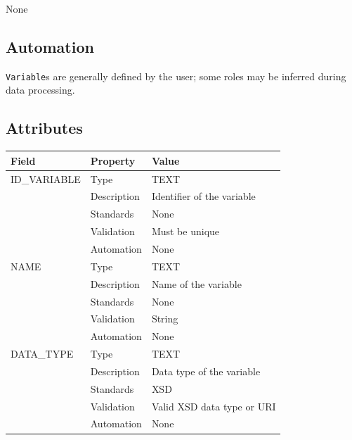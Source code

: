 \documentclass[
]{article}
\newcounter{none}
\begin{document}
None

\subsection{Automation}\label{automation-40}

\texttt{Variable}s are generally defined by the user; some roles may be
inferred during data processing.

\subsection{Attributes}\label{attributes-34}

{\def\LTcaptype{none} 
\begin{longtable}[]{@{}
  >{\raggedright\arraybackslash}p{}
  >{\raggedright\arraybackslash}p{}
  >{\raggedright\arraybackslash}p{}@{}}
\toprule\noalign{}
\begin{minipage}[b]{\linewidth}\raggedright
Field
\end{minipage} & \begin{minipage}[b]{\linewidth}\raggedright
Property
\end{minipage} & \begin{minipage}[b]{\linewidth}\raggedright
Value
\end{minipage} \\
\midrule\noalign{}
\endhead
\bottomrule\noalign{}
\endlastfoot
ID\_VARIABLE & Type & TEXT \\
& Description & Identifier of the variable \\
& Standards & None \\
& Validation & Must be unique \\
& Automation & None \\
NAME & Type & TEXT \\
& Description & Name of the variable \\
& Standards & None \\
& Validation & String \\
& Automation & None \\
DATA\_TYPE & Type & TEXT \\
& Description & Data type of the variable \\
& Standards & XSD \\
& Validation & Valid XSD data type or URI \\
& Automation & None \\

\end{longtable}}
\end{document}
